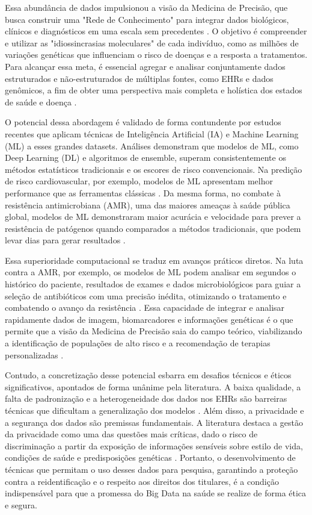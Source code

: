 Essa abundância de dados impulsionou a visão da Medicina de Precisão, que busca construir uma "Rede de Conhecimento" para integrar dados biológicos, clínicos e diagnósticos em uma escala sem precedentes \cite{NationalResearchCouncil2011}. O objetivo é compreender e utilizar as "idiossincrasias moleculares" de cada indivíduo, como as milhões de variações genéticas que influenciam o risco de doenças e a resposta a tratamentos. Para alcançar essa meta, é essencial agregar e analisar conjuntamente dados estruturados e não-estruturados de múltiplas fontes, como EHRs e dados genômicos, a fim de obter uma perspectiva mais completa e holística dos estados de saúde e doença \cite{Belle2015, NationalResearchCouncil2011}.

O potencial dessa abordagem é validado de forma contundente por estudos recentes que aplicam técnicas de Inteligência Artificial (IA) e Machine Learning (ML) a esses grandes datasets. Análises demonstram que modelos de ML, como Deep Learning (DL) e algoritmos de ensemble, superam consistentemente os métodos estatísticos tradicionais e os escores de risco convencionais. Na predição de risco cardiovascular, por exemplo, modelos de ML apresentam melhor performance que as ferramentas clássicas \cite{Liu2025}. Da mesma forma, no combate à resistência antimicrobiana (AMR), uma das maiores ameaças à saúde pública global, modelos de ML demonstraram maior acurácia e velocidade para prever a resistência de patógenos quando comparados a métodos tradicionais, que podem levar dias para gerar resultados \cite{Pennisi2025}.

Essa superioridade computacional se traduz em avanços práticos diretos. Na luta contra a AMR, por exemplo, os modelos de ML podem analisar em segundos o histórico do paciente, resultados de exames e dados microbiológicos para guiar a seleção de antibióticos com uma precisão inédita, otimizando o tratamento e combatendo o avanço da resistência \cite{Pennisi2025}. Essa capacidade de integrar e analisar rapidamente dados de imagem, biomarcadores e informações genéticas é o que permite que a visão da Medicina de Precisão saia do campo teórico, viabilizando a identificação de populações de alto risco e a recomendação de terapias personalizadas \cite{Liu2025, Pennisi2025}.

Contudo, a concretização desse potencial esbarra em desafios técnicos e éticos significativos, apontados de forma unânime pela literatura. A baixa qualidade, a falta de padronização e a heterogeneidade dos dados nos EHRs são barreiras técnicas que dificultam a generalização dos modelos \cite{Liu2025, Pennisi2025}. Além disso, a privacidade e a segurança dos dados são premissas fundamentais. A literatura destaca a gestão da privacidade como uma das questões mais críticas, dado o risco de discriminação a partir da exposição de informações sensíveis sobre estilo de vida, condições de saúde e predisposições genéticas \cite{Belle2015, NationalResearchCouncil2011, Pennisi2025}. Portanto, o desenvolvimento de técnicas que permitam o uso desses dados para pesquisa, garantindo a proteção contra a reidentificação e o respeito aos direitos dos titulares, é a condição indispensável para que a promessa do Big Data na saúde se realize de forma ética e segura.

